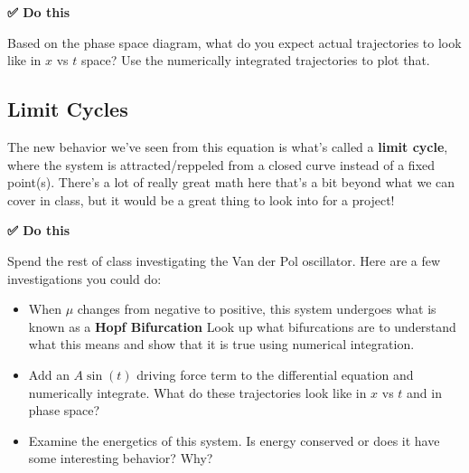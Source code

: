 \textbf{✅ Do this}

Based on the phase space diagram, what do you expect actual trajectories
to look like in \(x\) vs \(t\) space? Use the numerically integrated
trajectories to plot that.

\begin{Shaded}
\begin{Highlighting}[]

\end{Highlighting}
\end{Shaded}

\subsection{Limit Cycles}\label{limit-cycles}

The new behavior we've seen from this equation is what's called a
\textbf{limit cycle}, where the system is attracted/reppeled from a
closed curve instead of a fixed point(s). There's a lot of really great
math here that's a bit beyond what we can cover in class, but it would
be a great thing to look into for a project!

\textbf{✅ Do this}

Spend the rest of class investigating the Van der Pol oscillator. Here
are a few investigations you could do:

\begin{itemize}
\tightlist
\item
  When \(\mu\) changes from negative to positive, this system undergoes
  what is known as a \textbf{Hopf Bifurcation} Look up what bifurcations
  are to understand what this means and show that it is true using
  numerical integration.
\item
  Add an \(A\sin(t)\) driving force term to the differential equation
  and numerically integrate. What do these trajectories look like in
  \(x\) vs \(t\) and in phase space?
\item
  Examine the energetics of this system. Is energy conserved or does it
  have some interesting behavior? Why?
\end{itemize}
